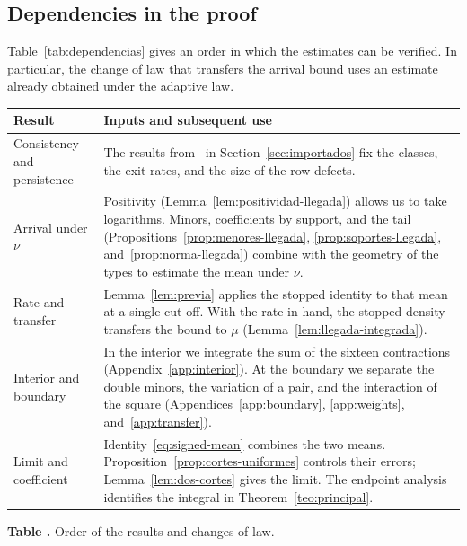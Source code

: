 \subsection{Dependencies in the proof}\label{sec:dependencias}
Table~\ref{tab:dependencias} gives an order in which the estimates can be verified. In particular, the
change of law that transfers the arrival bound uses an estimate already obtained under the adaptive law.
\begin{center}
\small
\begin{tabular}{@{}L{.30\linewidth}L{.63\linewidth}@{}}
\toprule Result & Inputs and subsequent use\\ \midrule
Consistency and persistence & The results from~\cite{pc,tc} in Section~\ref{sec:importados} fix the
classes, the exit rates, and the size of the row defects.\\
Arrival under \(\nu\) & Positivity (Lemma~\ref{lem:positividad-llegada}) allows us to take logarithms.
Minors, coefficients by support, and the tail (Propositions~\ref{prop:menores-llegada},
\ref{prop:soportes-llegada}, and~\ref{prop:norma-llegada}) combine with the geometry of the types to
estimate the mean under \(\nu\).\\
Rate and transfer & Lemma~\ref{lem:previa} applies the stopped identity to that mean at a single cut-off.
With the rate in hand, the stopped density transfers the bound to \(\mu\)
(Lemma~\ref{lem:llegada-integrada}).\\
Interior and boundary & In the interior we integrate the sum of the sixteen contractions
(Appendix~\ref{app:interior}). At the boundary we separate the double minors, the variation of a pair,
and the interaction of the square (Appendices~\ref{app:boundary}, \ref{app:weights},
and~\ref{app:transfer}).\\
Limit and coefficient & Identity~\eqref{eq:signed-mean} combines the two means.
Proposition~\ref{prop:cortes-uniformes} controls their errors; Lemma~\ref{lem:dos-cortes} gives the
limit. The endpoint analysis identifies the integral in Theorem~\ref{teo:principal}.\\
\bottomrule
\end{tabular}
\label{tab:dependencias}\par\smallskip
\textbf{Table \thetable.} Order of the results and changes of law.
\end{center}
